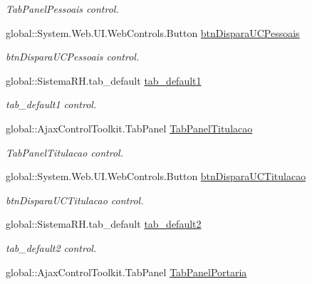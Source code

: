\begin{DoxyCompactItemize}
\begin{DoxyCompactList}\small\item\em TabPanelPessoais control. \item\end{DoxyCompactList}\item 
global::System.Web.UI.WebControls.Button \hyperlink{class_sistema_r_h_1_1_alterar_colaborador_a65c5bdcf85461b36a8387d636656d49f}{btnDisparaUCPessoais}
\begin{DoxyCompactList}\small\item\em btnDisparaUCPessoais control. \item\end{DoxyCompactList}\item 
global::SistemaRH.tab\_\-default \hyperlink{class_sistema_r_h_1_1_alterar_colaborador_ae8f691957080d211fdd2207d2b51aaf9}{tab\_\-default1}
\begin{DoxyCompactList}\small\item\em tab\_\-default1 control. \item\end{DoxyCompactList}\item 
global::AjaxControlToolkit.TabPanel \hyperlink{class_sistema_r_h_1_1_alterar_colaborador_aa85d98802a94ab43dc4c333e45841e33}{TabPanelTitulacao}
\begin{DoxyCompactList}\small\item\em TabPanelTitulacao control. \item\end{DoxyCompactList}\item 
global::System.Web.UI.WebControls.Button \hyperlink{class_sistema_r_h_1_1_alterar_colaborador_ab2a779632422f3526ce98d617dcc1beb}{btnDisparaUCTitulacao}
\begin{DoxyCompactList}\small\item\em btnDisparaUCTitulacao control. \item\end{DoxyCompactList}\item 
global::SistemaRH.tab\_\-default \hyperlink{class_sistema_r_h_1_1_alterar_colaborador_a8c9192f94dd44cfebf0ef89c9e9f2466}{tab\_\-default2}
\begin{DoxyCompactList}\small\item\em tab\_\-default2 control. \item\end{DoxyCompactList}\item 
global::AjaxControlToolkit.TabPanel \hyperlink{class_sistema_r_h_1_1_alterar_colaborador_a790090b0ba9c06fe12914ee681302203}{TabPanelPortaria}

\end{DoxyCompactItemize}
